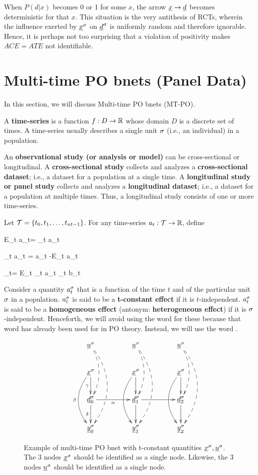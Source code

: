 When
$P(d|x)$
becomes 0 or 1 for some $x$,
the arrow
$\rvx\rarrow\rvd$
becomes deterministic
for that $x$.
This situation
is
the very
antithesis
of RCTs,
wherein
the influence
exerted by $\rvx^\s$ on
$\rvd^\s$ is uniformly
random and therefore ignorable.
Hence, it is perhaps
not too surprising
that a violation
of positivity makes
$ACE=ATE$
not identifiable.



\section{Multi-time PO bnets (Panel Data)}

In this section, we will
discuss Multi-time PO bnets (MT-PO).

A {\bf time-series} is a function $f:D\rightarrow { \mathbb{R}}$
whose domain $D$ is a discrete set
of times. A time-series
usually describes a single
unit $\sigma$ (i.e., an individual)
in a population.

An {\bf observational study (or analysis or model)}
can be cross-sectional or longitudinal.
A {\bf cross-sectional study}
collects and analyzes a {\bf cross-sectional dataset};
i.e., a dataset for a population
at a single time. A {\bf longitudinal study
or panel study} collects and analyzes
a {\bf longitudinal dataset};
i.e., a dataset for a population
at  multiple times.
Thus, a longitudinal study
consists of one or more time-series.

Let ${\cal T}=\{t_0, t_1, \ldots, t_{nt-1}\}$.
For any time-series $a_t: {\cal T}\rightarrow{ \mathbb{R}}$,
define

\beq
E_t a_t=
\sum_{t\in \calt} a_t
\eeq

\beq
\Delta_t a_t = a_t -E_t a_t
\eeq

\beq
{}_t= E_t \Delta_t a_t \Delta_t b_t
\eeq

Consider a quantity $a^\sigma_t$
that is a function of  the time $t$
and of the particular unit $\sigma$
in a population.
$a^\sigma_t$ is said to be a
 {\bf t-constant effect}
if it is $t$-independent.
$a^\sigma_t$ is said to be a
{\bf homogeneous effect}
(antonym: {\bf heterogeneous effect})
if it is
$\sigma$-independent.
Henceforth, we will avoid
using the word  for these
because that word
 has already been used for
 in
PO theory.
Instead, we will use the word .

\begin{figure}[h!]
$$\xymatrix @C=4pc {
\rvu^\s\ar@/^1pc/@{-->}[dd]\ar@/^2pc/@{-->}[ddd]
&\rvu^\s\ar@/^1pc/@{-->}[dd]\ar@/^2pc/@{-->}[ddd]
&\rvu^\s\ar@/^1pc/@{-->}[dd]\ar@/^2pc/@{-->}[ddd]
\\
\rvx^\s\ar[d]_\gamma\ar@/_1.5pc/[dd]_\beta
&\rvx^\s\ar[d]\ar@/_1.5pc/[dd]
&\rvx^\s\ar[d]\ar@/_1.5pc/[dd]
\\
\rvd^\s_0\ar[d]_\delta\ar[r]_\alp
&\rvd^\s_1\ar[d]\ar[r]
&\rvd^\s_2\ar[d]
\\
\rvy^\s_0
&\rvy^\s_1
&\rvy^\s_2
}$$
\caption{Example
of multi-time PO bnet
with t-constant quantities $\rvx^\s, \rvu^\s$.
The
3 nodes $\rvx^\s$
should be identified
as a single node.
 Likewise, the
3 nodes $\rvu^\s$
should be identified
as a single node.
}
\label{fig-dynamic-po}
\end{figure}

